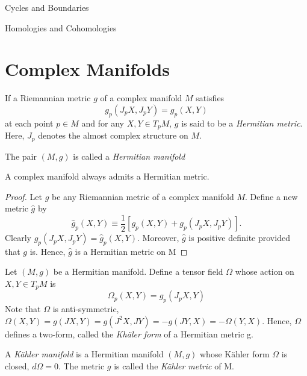 \begin{subsubsection}{Cycles and Boundaries}
\begin{subsubsection}{Homologies and Cohomologies}
\begin{definition}
\begin{definition}
\begin{theorem}
\end{theorem}

\section{Complex Manifolds}
\begin{definition}
If a Riemannian metric $g$ of a complex manifold $M$ satisfies 
\begin{equation}
g_p(J_pX, J_pY) = g_p(X,Y)
\end{equation}
at each point $p\in M$ and for any $X,Y\in T_p M$, $g$ is said to be a \textit{Hermitian metric}. Here, $J_p$ denotes the almost complex structure on $M$.
\end{definition}

\begin{definition}
The pair $(M,g)$ is called a \textit{Hermitian manifold}
\end{definition}

\begin{theorem}
A complex manifold always admits a Hermitian metric.
\end{theorem}

\begin{proof}
Let $g$ be any Riemannian metric of a complex manifold $M$. Define a new metric $\hat{g}$ by
\begin{equation}
\hat{g}_p(X,Y)\equiv \frac{1}{2}\left[g_p(X,Y) + g_p(J_pX, J_pY)\right].
\end{equation}
Clearly $\hat{g}_p(J_pX,J_pY) = \hat{g}_p(X,Y)$. Moreover, $\hat{g}$ is positive definite provided that $g$ is. Hence, $\hat{g}$ is a Hermitian metric on M
\end{proof}

\begin{definition}
  Let $(M,g)$ be a Hermitian manifold. Define a tensor field $\Omega$ whose
  action on $X,Y\in T_pM$ is
\begin{equation}
\Omega_p(X,Y) = g_p(J_pX,Y)
\end{equation}
Note that $\Omega$ is anti-symmetric, $\Omega(X,Y) = g(JX,Y) = g(J^2X,JY)
= -g(JY,X) = -\Omega(Y,X)$. Hence, $\Omega$ defines a two-form, called the
\textit{Kh\"aler form} of a Hermitian metric g.
\end{definition}

\begin{definition}
  A \textit{K\"ahler manifold} is a Hermitian manifold $(M,g)$ whose K\"ahler
  form $\Omega$ is closed, $d\Omega=0$. The metric $g$ is called the
  \textit{K\"ahler metric} of M.
\end{definition}


\end{definition}
\end{definition}
\end{subsubsection}
\end{subsubsection}

